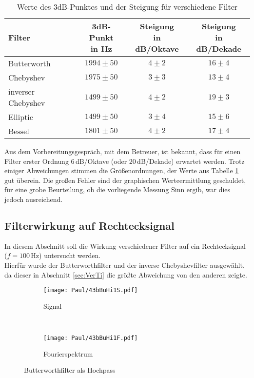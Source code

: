 \begin{table}[h]
    \centering
    \begin{tabular}[h]{l|c|c|c}
        Filter      & \makecell{3dB-Punkt\\in Hz} & \makecell{Steigung\\ in dB/Oktave} & \makecell{Steigung\\ in dB/Dekade} \\ \hline
        Butterworth &    $1994\pm50$   &        $4\pm2$        &      $16\pm4$         \\
        Chebyshev   &    $1975\pm50$   &        $3\pm3$        &      $13\pm4$         \\
        inverser Chebyshev &$1499\pm50$&        $4\pm2$        &      $19\pm3$         \\
        Elliptic    &     $1499\pm50$  &        $3\pm4$        &      $15\pm6$         \\
        Bessel      &     $1801\pm50$  &        $4\pm2$        &      $17\pm4$         \\
    \end{tabular}
    \caption{Werte des 3dB-Punktes und der Steigung für verschiedene Filter}
    \label{tab:Stei}
\end{table}
Aus dem Vorbereitungsgespräch, mit dem Betreuer, ist bekannt, dass für einen Filter erster Ordnung 6\,dB/Oktave (oder 20\,dB/Dekade) erwartet werden. Trotz einiger Abweichungen stimmen die Größenordnungen, der Werte aus Tabelle \ref{tab:Stei} gut überein. Die großen Fehler sind der graphischen Werteermittlung geschuldet, für eine grobe Beurteilung, ob die vorliegende Messung Sinn ergib, war dies jedoch ausreichend.




\newpage
\subsection{Filterwirkung auf Rechtecksignal}
In diesem Abschnitt soll die Wirkung verschiedener Filter auf ein Rechtecksignal\\ ($f=100$\,Hz) untersucht werden.\\
Hierfür wurde der Butterworthfilter und der inverse Chebyshevfilter ausgewählt, da dieser in Abschnitt \ref{sec:VerTi} die größte Abweichung von den anderen zeigte.

\begin{figure}[h]
    \centering
    \begin{subfigure}{0.9\textwidth}
        \centering
        \texttt{[image: Paul/43bBuHi1S.pdf]}
        \caption{Signal}
    \end{subfigure}
    \\
    \begin{subfigure}{0.9\textwidth}
        \centering
        \texttt{[image: Paul/43bBuHi1F.pdf]}
        \caption{Fourierspektrum}
    \end{subfigure}
    \caption{Butterworthfilter als Hochpass}
    \label{fig:43bBuHi1}
\end{figure}


